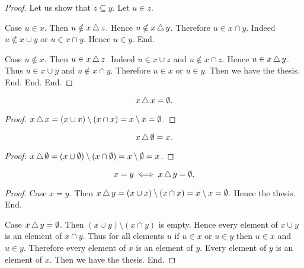 \documentclass[../../set-theory.ftl.tex]{subfiles}
\begin{document}
\begin{forthel}
\begin{proof}
        Let us show that $z \subseteq y$.
          Let $u \in z$.

          Case $u \in x$.
            Then $u \notin x \mathop{\triangle} z$.
            Hence $u \notin x \mathop{\triangle} y$.
            Therefore $u \in x \cap y$.
            Indeed $u \notin x \cup y$ or $u \in x \cap y$.
            Hence $u \in y$.
          End.

          Case $u \notin x$.
            Then $u \in x \mathop{\triangle} z$.
            Indeed $u \in x \cup z$ and $u \notin x \cap z$.
            Hence $u \in x \mathop{\triangle} y$.
            Thus $u \in x \cup y$ and $u \notin x \cap y$.
            Therefore $u \in x$ or $u \in y$.
            Then we have the thesis.
          End.
        End.
      End.
    \end{proof}


    \begin{proposition}\label{SetTheory_01_04_496712}
      \[ x \mathop{\triangle} x = \emptyset. \]
    \end{proposition}
    \begin{proof}
      $x \mathop{\triangle} x
      = (x \cup x) \setminus (x \cap x)
      = x \setminus x
      = \emptyset$.
    \end{proof}


    \begin{proposition}\label{SetTheory_01_04_182395}
      \[ x \mathop{\triangle} \emptyset = x. \]
    \end{proposition}
    \begin{proof}
      $x \mathop{\triangle} \emptyset
      = (x \cup \emptyset) \setminus (x \cap \emptyset)
      = x \setminus \emptyset = x$.
    \end{proof}


    \begin{proposition}\label{SetTheory_01_04_814558}
      \[ x = y \iff x \mathop{\triangle} y = \emptyset. \]
    \end{proposition}
    \begin{proof}
      Case $x = y$.
        Then $x \mathop{\triangle} y = (x \cup x) \setminus (x \cap x) = x \setminus x =
        \emptyset.$
        Hence the thesis.
      End.

      Case $x \mathop{\triangle} y = \emptyset$.
        Then $(x \cup y) \setminus (x \cap y)$ is empty.
        Hence every element of $x \cup y$ is an element of $x \cap y$.
        Thus for all elements $u$ if $u \in x$ or $u \in y$ then $u \in x$ and
        $u \in y$.
        Therefore every element of $x$ is an element of $y$.
        Every element of $y$ is an element of $x$.
        Then we have the thesis.
      End.
    \end{proof}
  \end{forthel}
\end{document}
